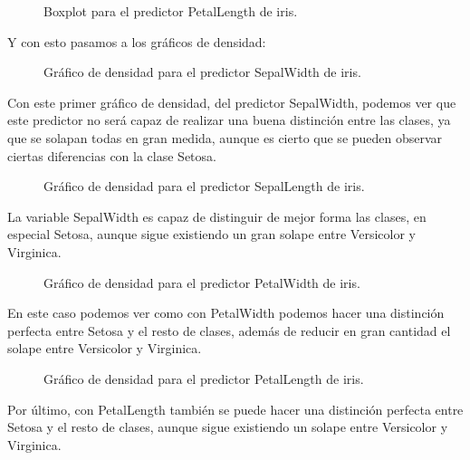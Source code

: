 \begin{figure}[H]
	\centering
	
	\caption{Boxplot para el predictor PetalLength de iris.}
	\label{fig:boxplot_iris_PetalLength}
\end{figure}


Y con esto pasamos a los gráficos de densidad:

\begin{figure}[H]
	\centering
	
	\caption{Gráfico de densidad para el predictor SepalWidth de iris.}
	\label{fig:densidad_iris_SepalWidth}
\end{figure}

Con este primer gráfico de densidad, del predictor SepalWidth, podemos ver que este predictor no será capaz de realizar una buena distinción entre las clases, ya que se solapan todas en gran medida, aunque es cierto que se pueden observar ciertas diferencias con la clase Setosa.

\begin{figure}[H]
	\centering
	
	\caption{Gráfico de densidad para el predictor SepalLength de iris.}
	\label{fig:densidad_iris_SepalLength}
\end{figure}

La variable SepalWidth es capaz de distinguir de mejor forma las clases, en especial Setosa, aunque sigue existiendo un gran solape entre Versicolor y Virginica.

\begin{figure}[H]
	\centering
	
	\caption{Gráfico de densidad para el predictor PetalWidth de iris.}
	\label{fig:densidad_iris_PetalWidth}
\end{figure}

En este caso podemos ver como con PetalWidth podemos hacer una distinción perfecta entre Setosa y el resto de clases, además de reducir en gran cantidad el solape entre Versicolor y Virginica.

\begin{figure}[H]
	\centering
	
	\caption{Gráfico de densidad para el predictor PetalLength de iris.}
	\label{fig:densidad_iris_PetalLength}
\end{figure}

Por último, con PetalLength también se puede hacer una distinción perfecta entre Setosa y el resto de clases, aunque sigue existiendo un solape entre Versicolor y Virginica.

